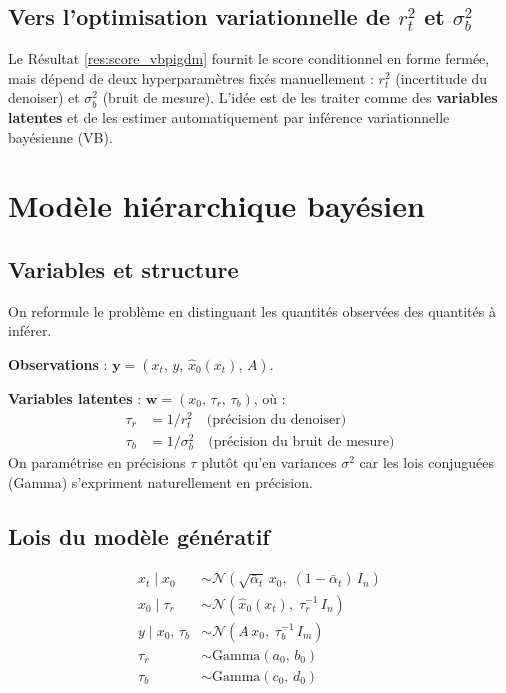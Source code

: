 \documentclass[12pt]{article}
\begin{document}
\subsection{Vers l'optimisation variationnelle de $r_t^2$ et $\sigma_b^2$}

Le Résultat 
\ref{res:score_vbpigdm} fournit le score conditionnel en forme fermée, mais dépend de deux hyperparamètres fixés manuellement 
: $r_t^2$ (incertitude du denoiser) et $\sigma_b^2$ (bruit de mesure). L'idée est de les traiter comme des \textbf{variables latentes} et de les estimer automatiquement par inférence variationnelle bayésienne (VB).

\newpage

\section{Modèle hiérarchique bayésien}

\subsection{Variables et structure}

On reformule le problème en distinguant les quantités observées des quantités à inférer.

\begin{definitionbox}
\label{def:vb_variables}
\textbf{Observations} 
: $\boldsymbol{y} = (x_t,\, y,\, \hat{x}_0(x_t),\, A)$.

\textbf{Variables latentes} 
: $\boldsymbol{w} = (x_0,\, \tau_r,\, \tau_b)$, où 
:
\begin{align}
    \tau_r &= 1/r_t^2 \quad \text{(précision du denoiser)} \\
    \tau_b &= 1/\sigma_b^2 \quad \text{(précision du bruit de mesure)}
\end{align}
On paramétrise en précisions $\tau$ plutôt qu'en variances $\sigma^2$ car les lois conjuguées (Gamma) s'expriment naturellement en précision.
\end{definitionbox}


\subsection{Lois du modèle génératif}

\begin{hypothesebox}
\label{hyp:hierarchical}
\begin{align}
    x_t \mid x_0 &\sim \mathcal{N}\!\left(\sqrt{\bar\alpha_t}\, x_0,\; (1 - \bar\alpha_t)\, I_n\right) \tag{M1} \label{eq:M1}\\[4pt]
    x_0 \mid \tau_r &\sim \mathcal{N}\!\left(\hat{x}_0(x_t),\; \tau_r^{-1}\, I_n\right) \tag{M2} \label{eq:M2}\\[4pt]
    y \mid x_0,\, \tau_b &\sim \mathcal{N}\!\left(A\, x_0,\; \tau_b^{-1}\, I_m\right) \tag{M3} \label{eq:M3}\\[4pt]
    \tau_r &\sim \mathrm{Gamma}(a_0,\, b_0) \tag{M4} \label{eq:M4}\\[4pt]
    \tau_b &\sim \mathrm{Gamma}(c_0,\, d_0) \tag{M5} \label{eq:M5}
\end{align}
\end{hypothesebox}
\end{document}
